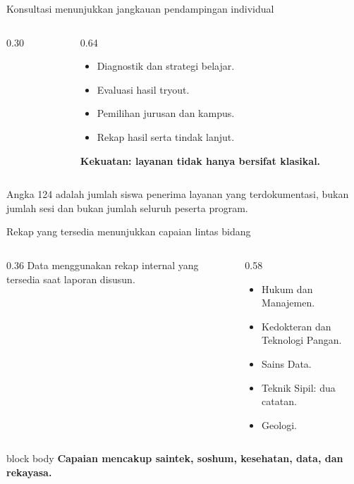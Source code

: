 \begin{frame}{Konsultasi menunjukkan jangkauan pendampingan individual}
  \begin{columns}[T,onlytextwidth]
    \begin{column}{0.30\textwidth}
    \end{column}
    \begin{column}{0.64\textwidth}
      \begin{itemize}
        \item Diagnostik dan strategi belajar.
        \item Evaluasi hasil tryout.
        \item Pemilihan jurusan dan kampus.
        \item Rekap hasil serta tindak lanjut.
      \end{itemize}
      \vspace{0.12cm}
      {\color{StudentGreen}\bfseries\fontsize{10.5}{13}\selectfont Kekuatan: layanan tidak hanya bersifat klasikal.}
    \end{column}
  \end{columns}
  \vspace{0.18cm}
  {\color{StudentGray}\fontsize{9.5}{11.8}\selectfont Angka 124 adalah jumlah siswa penerima layanan yang terdokumentasi, bukan jumlah sesi dan bukan jumlah seluruh peserta program.}
\end{frame}

\begin{frame}{Rekap yang tersedia menunjukkan capaian lintas bidang}
  \begin{columns}[T,onlytextwidth]
    \begin{column}{0.36\textwidth}
      \vspace{0.12cm}
      {\color{StudentGray}\fontsize{9.5}{11.8}\selectfont Data menggunakan rekap internal yang tersedia saat laporan disusun.}
    \end{column}
    \begin{column}{0.58\textwidth}
      \begin{itemize}
        \item Hukum dan Manajemen.
        \item Kedokteran dan Teknologi Pangan.
        \item Sains Data.
        \item Teknik Sipil: dua catatan.
        \item Geologi.
      \end{itemize}
    \end{column}
  \end{columns}
  \vspace{0.18cm}
  \begin{beamercolorbox}[rounded=true,sep=0.18cm,wd=\textwidth]{block body}
    \centering\bfseries Capaian mencakup saintek, soshum, kesehatan, data, dan rekayasa.
  \end{beamercolorbox}
\end{frame}


